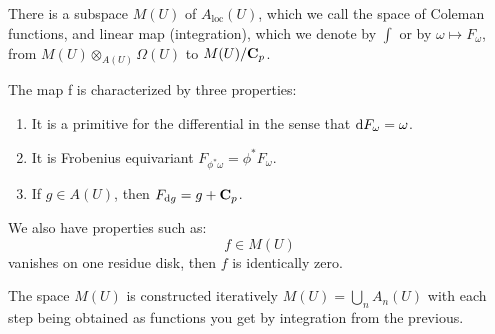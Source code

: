 \begin{frame}
\begin{theorem}
There is a subspace \(M(U)\) of \(A_{\operatorname{loc}} (U)\), which we call the space of Coleman functions, and linear map (integration), which we denote by \(\int\) or by \(\omega \mapsto F_\omega\), from \(M(U) \otimes_{A(U)} \Omega(U)\) to \(M(U)/\mathbf C_p\).%
\pause

The map f is characterized by three properties:\leavevmode%
\begin{enumerate}
\item\hypertarget{li-6}{}It is a primitive for the differential in the sense that \(\mathop{}\!\mathrm{d} F_{\omega} = \omega\).%
\item\hypertarget{li-7}{}It is Frobenius equivariant \(F_{ \phi^*\omega} =  \phi ^* F_\omega\).%
\item\hypertarget{li-8}{}If \(g \in A(U)\), then \(F_{\mathop{}\!\mathrm{d} g} = g + \mathbf C_p\).%
\end{enumerate}

\pause

We also have properties such as:%
\begin{equation*}
f\in M(U)
\end{equation*}
vanishes on one residue disk, then \(f\) is identically zero.%
\pause

The space \(M(U)\) is constructed iteratively \(M(U) = \bigcup_n A_n(U)\) with each step being obtained as functions you get by integration from the previous.%
\end{theorem}
\end{frame}

%
\typeout{************************************************}
\typeout{************************************************}

